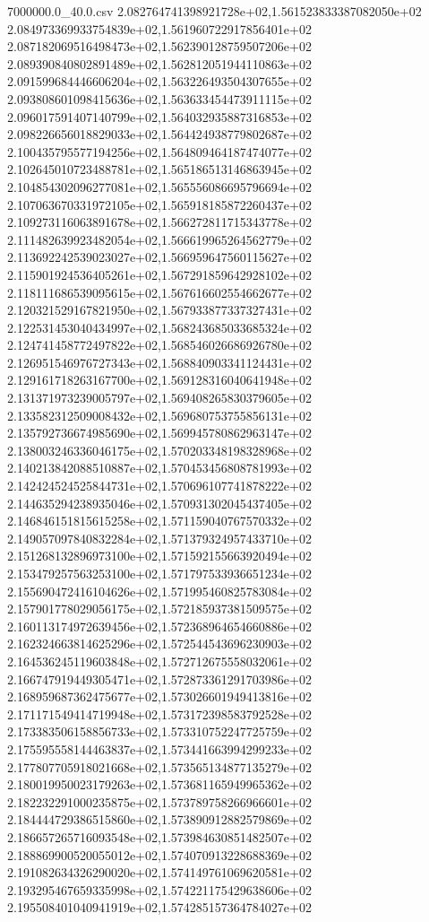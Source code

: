 \begin{filecontents*}{7000000.0_40.0.csv}
2.082764741398921728e+02,1.561523833387082050e+02
2.084973369933754839e+02,1.561960722917856401e+02
2.087182069516498473e+02,1.562390128759507206e+02
2.089390840802891489e+02,1.562812051944110863e+02
2.091599684446606204e+02,1.563226493504307655e+02
2.093808601098415636e+02,1.563633454473911115e+02
2.096017591407140799e+02,1.564032935887316853e+02
2.098226656018829033e+02,1.564424938779802687e+02
2.100435795577194256e+02,1.564809464187474077e+02
2.102645010723488781e+02,1.565186513146863945e+02
2.104854302096277081e+02,1.565556086695796694e+02
2.107063670331972105e+02,1.565918185872260437e+02
2.109273116063891678e+02,1.566272811715343778e+02
2.111482639923482054e+02,1.566619965264562779e+02
2.113692242539023027e+02,1.566959647560115627e+02
2.115901924536405261e+02,1.567291859642928102e+02
2.118111686539095615e+02,1.567616602554662677e+02
2.120321529167821950e+02,1.567933877337327431e+02
2.122531453040434997e+02,1.568243685033685324e+02
2.124741458772497822e+02,1.568546026686926780e+02
2.126951546976727343e+02,1.568840903341124431e+02
2.129161718263167700e+02,1.569128316040641948e+02
2.131371973239005797e+02,1.569408265830379605e+02
2.133582312509008432e+02,1.569680753755856131e+02
2.135792736674985690e+02,1.569945780862963147e+02
2.138003246336046175e+02,1.570203348198328968e+02
2.140213842088510887e+02,1.570453456808781993e+02
2.142424524525844731e+02,1.570696107741878222e+02
2.144635294238935046e+02,1.570931302045437405e+02
2.146846151815615258e+02,1.571159040767570332e+02
2.149057097840832284e+02,1.571379324957433710e+02
2.151268132896973100e+02,1.571592155663920494e+02
2.153479257563253100e+02,1.571797533936651234e+02
2.155690472416104626e+02,1.571995460825783084e+02
2.157901778029056175e+02,1.572185937381509575e+02
2.160113174972639456e+02,1.572368964654660886e+02
2.162324663814625296e+02,1.572544543696230903e+02
2.164536245119603848e+02,1.572712675558032061e+02
2.166747919449305471e+02,1.572873361291703986e+02
2.168959687362475677e+02,1.573026601949413816e+02
2.171171549414719948e+02,1.573172398583792528e+02
2.173383506158856733e+02,1.573310752247725759e+02
2.175595558144463837e+02,1.573441663994299233e+02
2.177807705918021668e+02,1.573565134877135279e+02
2.180019950023179263e+02,1.573681165949965362e+02
2.182232291000235875e+02,1.573789758266966601e+02
2.184444729386515860e+02,1.573890912882579869e+02
2.186657265716093548e+02,1.573984630851482507e+02
2.188869900520055012e+02,1.574070913228688369e+02
2.191082634326290020e+02,1.574149761069620581e+02
2.193295467659335998e+02,1.574221175429638606e+02
2.195508401040941919e+02,1.574285157364784027e+02

\end{filecontents*}
